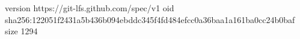 version https://git-lfs.github.com/spec/v1
oid sha256:122051f2431a5b436b094ebddc345f4fd484efcc0a36baa1a161ba0cc24b0baf
size 1294
